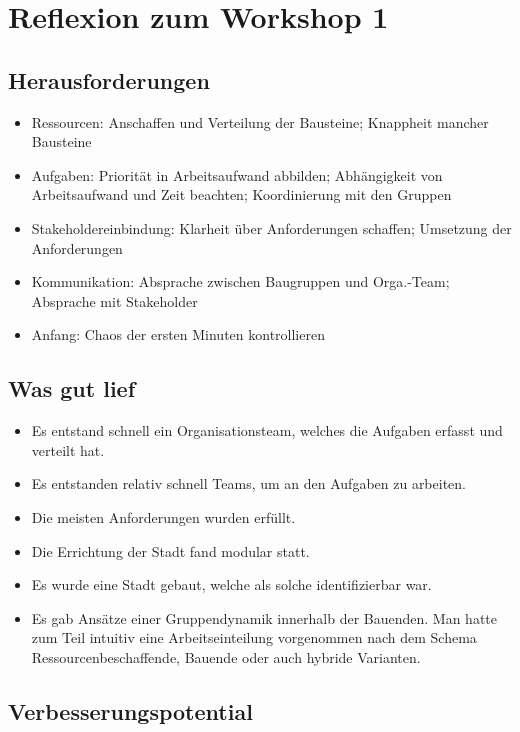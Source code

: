\documentclass[a4paper, 11pt]{article}
\begin{document}
	\pagebreak
	\setcounter{page}{1}
	\tableofcontents
	
	\pagebreak
	
	\section{Reflexion zum Workshop 1}

\subsection{Herausforderungen} 
\begin{itemize}
    \item Ressourcen: Anschaffen und Verteilung der Bausteine; Knappheit mancher Bausteine
    \item Aufgaben: Priorität in Arbeitsaufwand abbilden; Abhängigkeit von Arbeitsaufwand und Zeit beachten; Koordinierung mit den Gruppen
    \item Stakeholdereinbindung: Klarheit über Anforderungen schaffen; Umsetzung der Anforderungen
    \item Kommunikation: Absprache zwischen Baugruppen und Orga.-Team; Absprache mit Stakeholder
    \item Anfang: Chaos der ersten Minuten kontrollieren
\end{itemize}

\subsection{Was gut lief}
\begin{itemize}
    \item Es entstand schnell ein Organisationsteam, welches die Aufgaben erfasst und verteilt hat.
    \item Es entstanden relativ schnell Teams, um an den Aufgaben zu arbeiten.
    \item Die meisten Anforderungen wurden erfüllt.
    \item Die Errichtung der Stadt fand modular statt.
    \item Es wurde eine Stadt gebaut, welche als solche identifizierbar war.
    \item Es gab Ansätze einer Gruppendynamik innerhalb der Bauenden. Man hatte zum Teil intuitiv eine Arbeitseinteilung vorgenommen nach dem Schema Ressourcenbeschaffende, Bauende oder auch hybride Varianten.
\end{itemize}

\subsection{Verbesserungspotential}
\end{document}
